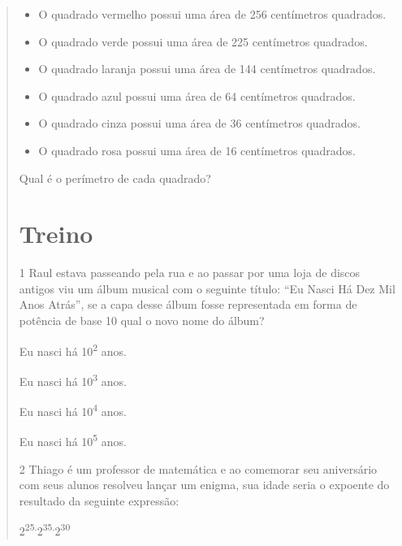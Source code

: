 \begin{quote}
\begin{itemize}
\item O quadrado vermelho possui uma área de 256 centímetros quadrados.

\item O quadrado verde possui uma área de 225 centímetros quadrados.

\item O quadrado laranja possui uma área de 144 centímetros quadrados.

\item O quadrado azul possui uma área de 64 centímetros quadrados.

\item O quadrado cinza possui uma área de 36 centímetros quadrados.

\item O quadrado rosa possui uma área de 16 centímetros quadrados.
\end{itemize}

Qual é o perímetro de cada quadrado?

\hfill

\section{Treino}

\num{1} Raul estava passeando pela rua e ao passar por uma loja de discos
antigos viu um álbum musical com o seguinte título: ``Eu Nasci Há Dez
Mil Anos Atrás'', se a capa desse álbum fosse representada em forma de
potência de base 10 qual o novo nome do álbum?

\begin{escolha}
\item Eu nasci há 10\textsuperscript{2} anos.
\item Eu nasci há 10\textsuperscript{3} anos.
\item Eu nasci há 10\textsuperscript{4} anos.
\item Eu nasci há 10\textsuperscript{5} anos.
\end{escolha}


\num{2} Thiago é um professor de matemática e ao comemorar seu aniversário
com seus alunos resolveu lançar um enigma, sua idade seria o expoente do
resultado da seguinte expressão:

2\textsuperscript{25.}2\textsuperscript{35.}2\textsuperscript{30}


\end{quote}
